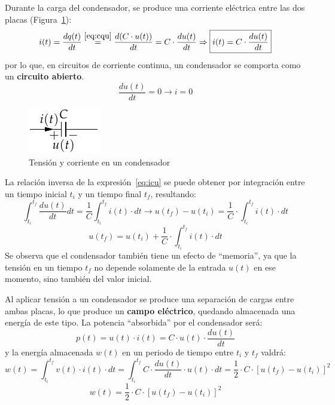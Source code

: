 	Durante la carga del condensador, se produce una corriente
        eléctrica entre las dos placas (Figura~\ref{fig:condensador}):
	\begin{equation}\label{eq:icu}
          i(t)=\dfrac{dq(t)}{dt}\stackrel{\eqref{eq:cqu}}{=}\dfrac{d(C\cdot u(t))}{dt}=C\cdot \dfrac{du(t)}{dt} \Rightarrow \boxed{i(t)=C\cdot \dfrac{du(t)}{dt}}
	\end{equation}
	por lo que, en circuitos de corriente continua, un condensador
        se comporta como un \textbf{circuito abierto}.
	\begin{equation*}
          \frac{du(t)}{dt} = 0 \rightarrow i = 0
	\end{equation*}
	\begin{figure}[H]
          \centering
          \includegraphics[width=0.15\linewidth]{../figs/Condensador.pdf}
          \caption{Tensión y corriente en un condensador}
          \label{fig:condensador}
	\end{figure}
	
	La relación inversa de la expresión~\eqref{eq:icu} se puede
        obtener por integración entre un tiempo inicial $t_i$ y un
        tiempo final $t_f$, resultando:
	\begin{equation*}
          \int_{t_i}^{t_f} \dfrac{du(t)}{dt}dt=\dfrac{1}{C}\int_{t_i}^{t_f}i(t)\cdot dt \rightarrow u(t_f)-u(t_i)=\dfrac{1}{C}\cdot\int_{t_i}^{t_f} i(t)\cdot dt
	\end{equation*}
	\begin{equation}\label{eq:u_C}
          \boxed{u(t_f)=u(t_i)+\dfrac{1}{C}\cdot\int_{t_i}^{t_f} i(t)\cdot dt}
	\end{equation}
	Se observa que el condensador también tiene un efecto de
        ``memoria'', ya que la tensión en un tiempo $t_f$ no depende
        solamente de la entrada $u(t)$ en ese momento, sino también
        del valor inicial.
	
	Al aplicar tensión a un condensador se produce una separación
        de cargas entre ambas placas, lo que produce un \textbf{campo
          eléctrico}, quedando almacenada una energía de este tipo. La
        potencia ``absorbida'' por el condensador será:
	\begin{equation*}
          p(t)=u(t)\cdot i(t)=C\cdot u(t)\cdot\dfrac{du(t)}{dt}
	\end{equation*}
	y la energía almacenada $w(t)$ en un periodo de tiempo entre
        $t_i$ y $t_f$ valdrá:
	\begin{equation*}
          w(t)=\int_{t_i}^{t_f}v(t)\cdot i(t)\cdot dt=\int_{t_i}^{t_f}C\cdot\dfrac{du(t)}{dt}\cdot u(t)\cdot dt=\dfrac{1}{2}\cdot C\cdot [u(t_f)-u(t_i)]^2
	\end{equation*}
	\begin{equation}
          \boxed{w(t)=\dfrac{1}{2}\cdot C\cdot [u(t_f)-u(t_i)]^2}
	\end{equation}

